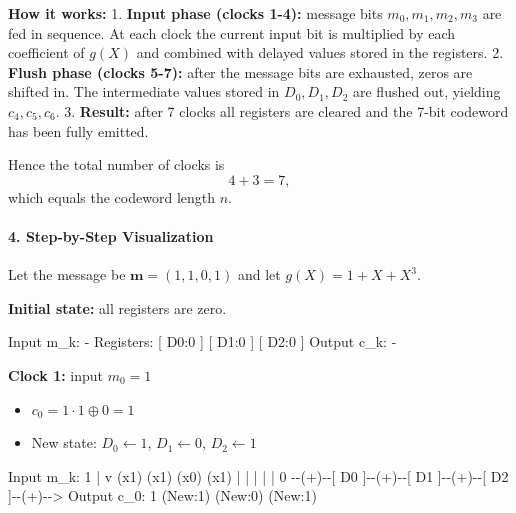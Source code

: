 \documentclass[11pt,oneside]{book}
\newenvironment{Shaded}{}{}
\newcommand{\NormalTok}[1]{#1}
\providecommand{\tightlist}{\setlength{\itemsep}{0pt}\setlength{\parskip}{0pt}}
\theoremstyle{plain}
\theoremstyle{definition}
\theoremstyle{remark}
\begin{document}
\textbf{How it works:} 1. \textbf{Input phase (clocks 1-4):} message
bits \(m_0,m_1,m_2,m_3\) are fed in sequence. At each clock the current
input bit is multiplied by each coefficient of \(g(X)\) and combined
with delayed values stored in the registers. 2. \textbf{Flush phase
(clocks 5-7):} after the message bits are exhausted, zeros are shifted
in. The intermediate values stored in \(D_0,D_1,D_2\) are flushed out,
yielding \(c_4,c_5,c_6\). 3. \textbf{Result:} after 7 clocks all
registers are cleared and the 7-bit codeword has been fully emitted.

Hence the total number of clocks is \[4 + 3 = 7,\] which equals the
codeword length \(n\).

\paragraph{4. Step-by-Step
Visualization}\label{step-by-step-visualization}

Let the message be \(\mathbf{m}=(1,1,0,1)\) and let \(g(X)=1+X+X^3\).

\textbf{Initial state:} all registers are zero.

\begin{Shaded}
\begin{Highlighting}[]
\NormalTok{Input m\_k: {-}}
\NormalTok{Registers: [ D0:0 ] [ D1:0 ] [ D2:0 ]}
\NormalTok{Output c\_k: {-}}
\end{Highlighting}
\end{Shaded}

\textbf{Clock 1:} input \(m_0=1\)

\begin{itemize}
\tightlist
\item
  \(c_0 = 1 \cdot 1 \oplus 0 = 1\)
\item
  New state: \(D_0 \leftarrow 1\), \(D_1 \leftarrow 0\),
  \(D_2 \leftarrow 1\)
\end{itemize}

\begin{Shaded}
\begin{Highlighting}[]
\NormalTok{Input m\_k: 1}
\NormalTok{     |}
\NormalTok{     v (x1)   (x1)   (x0)   (x1)}
\NormalTok{     |   |      |      |      |}
\NormalTok{0 {-}{-}(+){-}{-}[ D0 ]{-}{-}(+){-}{-}[ D1 ]{-}{-}(+){-}{-}[ D2 ]{-}{-}(+){-}{-}\textgreater{} Output c\_0: 1}
\NormalTok{         (New:1)      (New:0)      (New:1)}
\end{Highlighting}
\end{Shaded}
\end{document}
